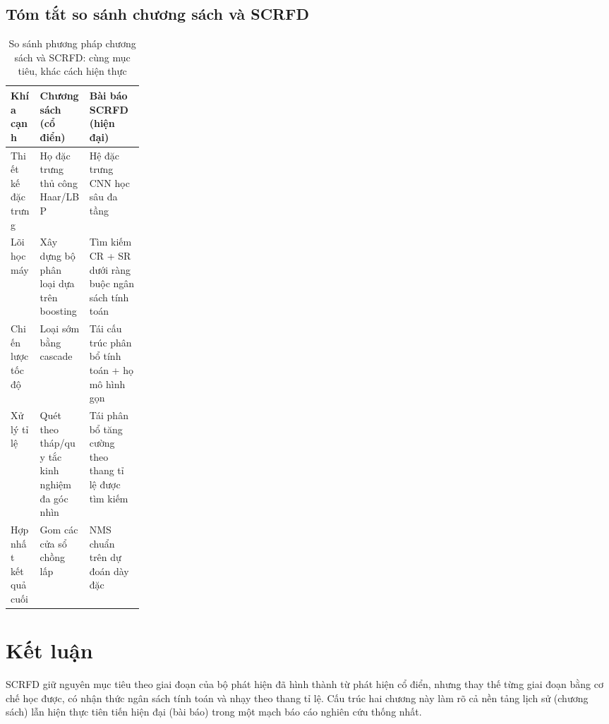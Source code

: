 \subsection{Tóm tắt so sánh chương sách và SCRFD}

\begin{table}[H]
\centering
\caption{So sánh phương pháp chương sách và SCRFD: cùng mục tiêu, khác cách hiện thực}
\label{tab:textbook-scrfd-diff}
\begingroup
\renewcommand{\arraystretch}{1.18}
\small
\setlength{\tabcolsep}{4pt}
\begin{tabularx}{\textwidth}{>{\RaggedRight\arraybackslash}p{0.22\linewidth} >{\RaggedRight\arraybackslash}X >{\RaggedRight\arraybackslash}X}
\toprule
\textbf{Khía cạnh} & \textbf{Chương sách (cổ điển)} & \textbf{Bài báo SCRFD (hiện đại)} \\
\midrule
Thiết kế đặc trưng & Họ đặc trưng thủ công Haar/LBP & Hệ đặc trưng CNN học sâu đa tầng \\
Lõi học máy & Xây dựng bộ phân loại dựa trên boosting & Tìm kiếm CR + SR dưới ràng buộc ngân sách tính toán \\
Chiến lược tốc độ & Loại sớm bằng cascade & Tái cấu trúc phân bổ tính toán + họ mô hình gọn \\
Xử lý tỉ lệ & Quét theo tháp/quy tắc kinh nghiệm đa góc nhìn & Tái phân bổ tăng cường theo thang tỉ lệ được tìm kiếm \\
Hợp nhất kết quả cuối & Gom các cửa sổ chồng lấp & NMS chuẩn trên dự đoán dày đặc \\
\bottomrule
\end{tabularx}
\endgroup
\end{table}

\section{Kết luận}

SCRFD giữ nguyên mục tiêu theo giai đoạn của bộ phát hiện đã hình thành từ phát hiện cổ điển,
nhưng thay thế từng giai đoạn bằng cơ chế học được, có nhận thức ngân sách tính toán và nhạy theo thang tỉ lệ.
Cấu trúc hai chương này làm rõ cả nền tảng lịch sử (chương sách)
lẫn hiện thực tiên tiến hiện đại (bài báo) trong một mạch báo cáo nghiên cứu thống nhất.




